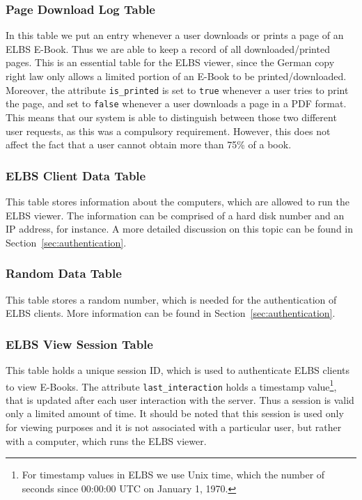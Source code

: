 \subsubsection{Page Download Log Table}
In this table we put an entry whenever a user downloads or prints a page of an ELBS E-Book. Thus we are able to keep a record of all downloaded/printed pages. This is an essential table for the ELBS viewer, since the German copy right law only allows a limited portion of an E-Book to be printed/downloaded.  Moreover, the attribute \verb=is_printed= is set to \verb=true= whenever a user tries to print the page, and set to \verb=false= whenever a user downloads a page in a PDF format. This means that our system is able to distinguish between those two different user requests,  as this was a compulsory requirement. However, this does not affect the fact that a user cannot obtain more than 75\% of a book. 

\subsubsection{ELBS Client Data Table}
This table stores information about the computers, which are allowed to run the ELBS viewer. The information can be comprised of a hard disk number and an IP address, for instance. A more detailed discussion on this topic can be found in Section~\ref{sec:authentication}.

\subsubsection{Random Data Table}
This table stores a random number, which is needed for the authentication of ELBS clients.  More information can be found in 
Section~\ref{sec:authentication}. 

\subsubsection{ELBS View Session Table}
This table holds a unique session ID, which is used to authenticate ELBS clients to view E-Books. The attribute \verb=last_interaction= holds a timestamp value\footnote{For timestamp values in ELBS we use Unix time, which the number of seconds since 00:00:00 UTC on January 1, 1970.},
that is updated after each user interaction with the server. Thus a session is valid only a limited amount of time. It should be noted that this session is used only for viewing purposes and it is not associated with a particular user, but rather with a computer, which runs the ELBS viewer.


